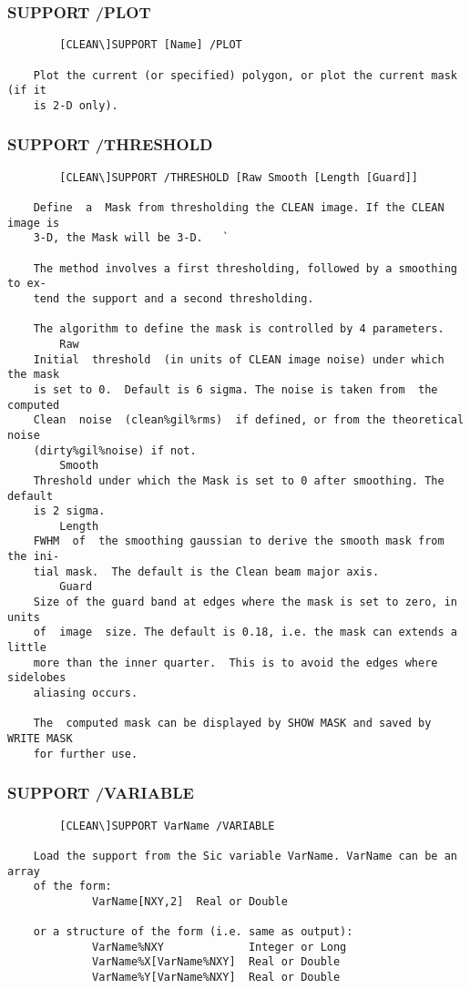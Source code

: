 \subsubsection{SUPPORT /PLOT}
\begin{verbatim}
        [CLEAN\]SUPPORT [Name] /PLOT

    Plot the current (or specified) polygon, or plot the current mask (if it
    is 2-D only).

\end{verbatim}
\subsubsection{SUPPORT /THRESHOLD}
\begin{verbatim}
        [CLEAN\]SUPPORT /THRESHOLD [Raw Smooth [Length [Guard]]

    Define  a  Mask from thresholding the CLEAN image. If the CLEAN image is
    3-D, the Mask will be 3-D.   `

    The method involves a first thresholding, followed by a smoothing to ex-
    tend the support and a second thresholding.

    The algorithm to define the mask is controlled by 4 parameters.
        Raw
    Initial  threshold  (in units of CLEAN image noise) under which the mask
    is set to 0.  Default is 6 sigma. The noise is taken from  the  computed
    Clean  noise  (clean%gil%rms)  if defined, or from the theoretical noise
    (dirty%gil%noise) if not.
        Smooth
    Threshold under which the Mask is set to 0 after smoothing. The  default
    is 2 sigma.
        Length
    FWHM  of  the smoothing gaussian to derive the smooth mask from the ini-
    tial mask.  The default is the Clean beam major axis.
        Guard
    Size of the guard band at edges where the mask is set to zero, in  units
    of  image  size. The default is 0.18, i.e. the mask can extends a little
    more than the inner quarter.  This is to avoid the edges where sidelobes
    aliasing occurs.

    The  computed mask can be displayed by SHOW MASK and saved by WRITE MASK
    for further use.

\end{verbatim}
\subsubsection{SUPPORT /VARIABLE}
\begin{verbatim}
        [CLEAN\]SUPPORT VarName /VARIABLE

    Load the support from the Sic variable VarName. VarName can be an  array
    of the form:
             VarName[NXY,2]  Real or Double

    or a structure of the form (i.e. same as output):
             VarName%NXY             Integer or Long
             VarName%X[VarName%NXY]  Real or Double
             VarName%Y[VarName%NXY]  Real or Double


\end{verbatim}
